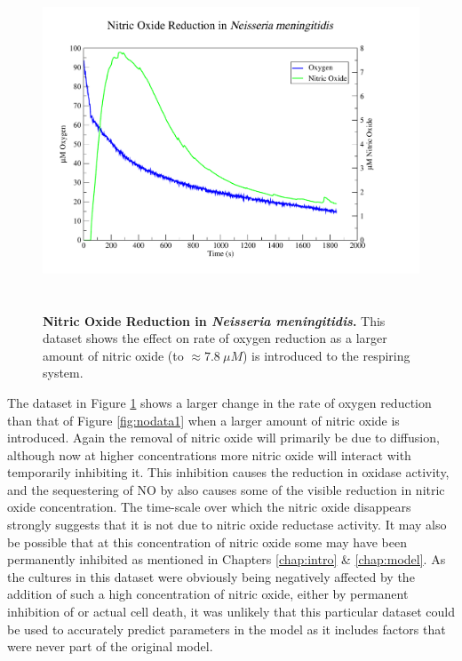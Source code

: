 \begin{figure}[tbp]
 \centering
 \includegraphics[height=10cm, trim=1cm 1cm 3cm 1cm, clip=true]{./06-noreduction/data/aer-no-data2.pdf}
 \caption[{Nitric Oxide Reduction in \textit{Neisseria meningitidis}.}]{{\bf Nitric Oxide Reduction in \textit{Neisseria meningitidis}.} This dataset shows the effect on rate of oxygen reduction as a larger amount of nitric oxide (to $\approx 7.8~\mu M$) is introduced to the respiring system.}
 \label{fig:nodata2}
\end{figure}
The dataset in Figure \ref{fig:nodata2} shows a larger change in the rate of oxygen reduction than that of Figure \ref{fig:nodata1} when a larger amount of nitric oxide is introduced. Again the removal of nitric oxide will primarily be due to diffusion, although now at higher concentrations more nitric oxide will interact with \cbbthree{} temporarily inhibiting it. This inhibition causes the reduction in oxidase activity, and the sequestering of NO by \cbbthree{} also causes some of the visible reduction in nitric oxide concentration. The time-scale over which the nitric oxide disappears strongly suggests that it is not due to nitric oxide reductase activity. It may also be possible that at this concentration of nitric oxide some \cbbthree{} may have been permanently inhibited as mentioned in Chapters \ref{chap:intro} \& \ref{chap:model}. As the cultures in this dataset were obviously being negatively affected by the addition of such a high concentration of nitric oxide, either by permanent inhibition of \cbbthree{} or actual cell death, it was unlikely that this particular dataset could be used to accurately predict parameters in the model as it includes factors that were never part of the original model.


